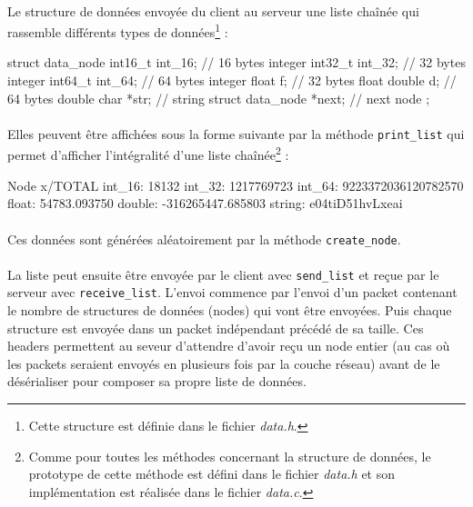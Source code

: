 \documentclass{article}
\begin{document}
    \paragraph{}
    Le structure de données envoyée du client au serveur une liste chaînée qui rassemble différents types de données\footnote{Cette structure est définie dans le fichier \emph{data.h}.} :
    \begin{verbatimtab}
        struct data_node {
            int16_t int_16;             // 16 bytes integer
            int32_t int_32;             // 32 bytes integer
            int64_t int_64;             // 64 bytes integer
            float   f;                  // 32 bytes float
            double  d;                  // 64 bytes double
            char    *str;               // string
            struct data_node *next;     // next node
            };
    \end{verbatimtab}

    \paragraph{}
    Elles peuvent être affichées sous la forme suivante par la méthode \texttt{print\_list} qui permet d'afficher l'intégralité d'une liste chaînée\footnote{Comme pour toutes les méthodes concernant la structure de données, le prototype de cette méthode est défini dans le fichier \emph{data.h} et son implémentation est réalisée dans le fichier \emph{data.c}.} :
    \begin{verbatimtab}
        Node x/TOTAL {
            int_16: 18132
            int_32: 1217769723
            int_64: 9223372036120782570
            float:  54783.093750
            double: -316265447.685803
            string: e04tiD51hvLxeai
        }
    \end{verbatimtab}

    \newpage
    \paragraph{}
    Ces données sont générées aléatoirement par la méthode \texttt{create\_node}.

    \paragraph{}
    La liste peut ensuite être envoyée par le client avec \texttt{send\_list} et reçue par le serveur avec \texttt{receive\_list}. L'envoi commence par l'envoi d'un packet contenant le nombre de structures de données (nodes) qui vont être envoyées. Puis chaque structure est envoyée dans un packet indépendant précédé de sa taille. Ces headers permettent au seveur d'attendre d'avoir reçu un node entier (au cas où les packets seraient envoyés en plusieurs fois par la couche réseau) avant de le désérialiser pour composer sa propre liste de données.
\end{document}
